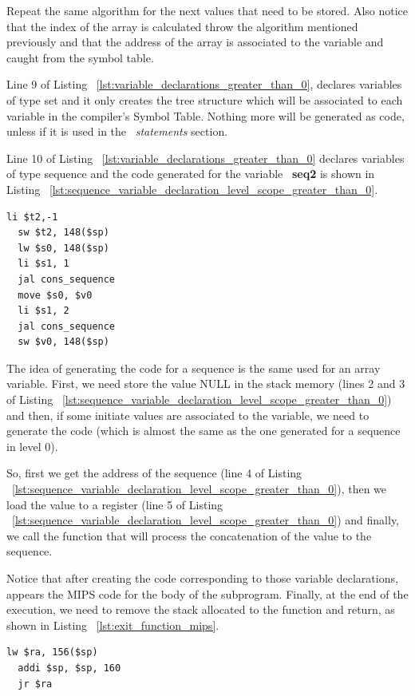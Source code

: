 \documentclass[
  oneside,
  11pt, a4paper,
  footinclude=true,
  headinclude=true,
  cleardoublepage=empty
]{scrbook}
\begin{document}
Repeat the same algorithm for the next values that need to be stored. Also notice that the index of the array is calculated throw the algorithm mentioned previously and that the address of the array is associated to the variable and caught from the symbol table.

Line 9 of Listing ~\ref{lst:variable_declarations_greater_than_0}, declares variables of type set and it only creates the tree structure which will be associated to each variable in the compiler's Symbol Table. Nothing more will be generated as code, unless if it is used in the ~\textit{statements} section.

Line 10 of Listing ~\ref{lst:variable_declarations_greater_than_0} declares variables of type sequence and the code generated for the variable ~\textbf{seq2} is shown in Listing ~\ref{lst:sequence_variable_declaration_level_scope_greater_than_0}.

\begin{lstlisting}[caption={Declaring sequence variable in level scope greater than 0},label={lst:sequence_variable_declaration_level_scope_greater_than_0}]
  li $t2,-1		
  sw $t2, 148($sp)		
  lw $s0, 148($sp)	
  li $s1, 1		
  jal cons_sequence		
  move $s0, $v0		
  li $s1, 2		
  jal cons_sequence		
  sw $v0, 148($sp)		
\end{lstlisting}

The idea of  generating the code for a sequence is the same used for an array variable.
First, we need store the value NULL in the stack memory (lines 2 and 3 of Listing ~\ref{lst:sequence_variable_declaration_level_scope_greater_than_0}) and then, if some initiate values are associated to the variable, we need to generate the code (which is almost the same as  the one generated for a sequence in level 0).

So, first we get the address of the sequence (line 4 of Listing ~\ref{lst:sequence_variable_declaration_level_scope_greater_than_0}), then we load the value to a register (line 5 of Listing ~\ref{lst:sequence_variable_declaration_level_scope_greater_than_0}) and finally, we call the function that will process the concatenation of the value to the sequence.

Notice that after creating the code corresponding to those variable declarations, appears the MIPS code for the body of the subprogram. Finally, at the end of the execution, we need to remove the stack allocated to the function and return, as shown in Listing ~\ref{lst:exit_function_mips}.

\begin{lstlisting}[caption={Exiting the function in MIPS assembly code},label={lst:exit_function_mips}]
  lw $ra, 156($sp)		
  addi $sp, $sp, 160		
  jr $ra	
\end{lstlisting}
\end{document}
